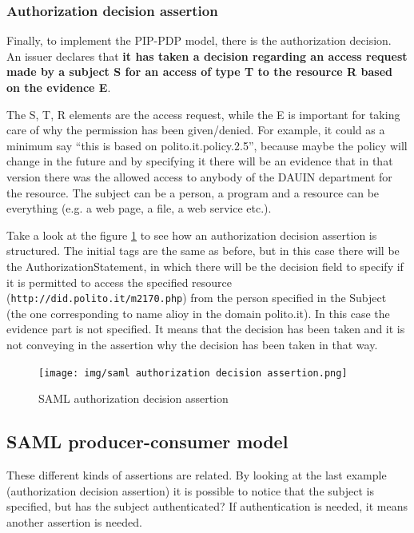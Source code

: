\subsubsection{Authorization decision assertion}
Finally, to implement the PIP-PDP model, there is the authorization
decision. An issuer declares that \textbf{it has taken a decision
  regarding an access request made by a subject S for an access of
  type T to the resource R based on the evidence E}.

The S, T, R elements are the access request, while the E is important
for taking care of why the permission has been given/denied. For
example, it could as a minimum say “this is based on
polito.it.policy.2.5”, because maybe the policy will change in the
future and by specifying it there will be an evidence that in that
version there was the allowed access to anybody of the DAUIN
department for the resource. The subject can be a person, a program
and a resource can be everything (e.g. a web page, a file, a web
service etc.).

Take a look at the figure \ref{fig:saml-auth-decision-assertion} to
see how an authorization decision assertion is structured. 
The initial tags are the same as before, but in this case there will
be the AuthorizationStatement, in which there will be the decision
field to specify if it is permitted to access the specified resource
(\texttt{http://did.polito.it/m2170.php}) from the person specified in
the Subject (the one corresponding to name alioy in the domain
polito.it). In this case the evidence part is not specified. It means
that the decision has been taken and it is not conveying in the
assertion why the decision has been taken in that way.

\begin{figure}[H]
  \centering
  \texttt{[image: img/saml authorization
  decision assertion.png]}
  \caption{SAML authorization decision assertion}
  \label{fig:saml-auth-decision-assertion}
\end{figure}

\subsection{SAML producer-consumer model}
These different kinds of assertions are related. By looking at the
last example (authorization decision assertion) it is possible to
notice that the subject is specified, but has the subject
authenticated? If authentication is needed, it means another assertion
is needed.

